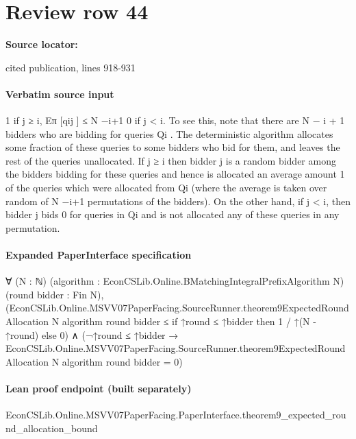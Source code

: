 \documentclass[10pt]{article}
\begin{document}
\section*{Review row 44}
\textbf{Source locator:} {\footnotesize\raggedright cited publication, lines 918-\allowbreak{}931\par}
\paragraph{Verbatim source input}
\begin{ReviewVerbatim}
1
if j ≥ i,
Eπ [qij ] ≤ N −i+1
0
if j < i.
To see this, note that there are N − i + 1 bidders who are bidding for queries Qi . The
deterministic algorithm allocates some fraction of these queries to some bidders who bid for
them, and leaves the rest of the queries unallocated. If j ≥ i then bidder j is a random
bidder among the bidders bidding for these queries and hence is allocated an average amount
1
of the queries which were allocated from Qi (where the average is taken over random
of N −i+1
permutations of the bidders). On the other hand, if j < i, then bidder j bids 0 for queries in
Qi and is not allocated any of these queries in any permutation.
\end{ReviewVerbatim}


\paragraph{Expanded PaperInterface specification}
\begin{ReviewVerbatim}
∀ (N : ℕ) (algorithm : EconCSLib.Online.BMatchingIntegralPrefixAlgorithm N) (round bidder : Fin N),
  (EconCSLib.Online.MSVV07PaperFacing.SourceRunner.theorem9ExpectedRoundAllocation N algorithm round bidder ≤
      if ↑round ≤ ↑bidder then 1 / ↑(N - ↑round) else 0) ∧
    (¬↑round ≤ ↑bidder →
      EconCSLib.Online.MSVV07PaperFacing.SourceRunner.theorem9ExpectedRoundAllocation N algorithm round bidder = 0)
\end{ReviewVerbatim}

\paragraph{Lean proof endpoint (built separately)}\begin{ReviewVerbatim}
EconCSLib.Online.MSVV07PaperFacing.PaperInterface.theorem9_expected_round_allocation_bound
\end{ReviewVerbatim}
\end{document}
